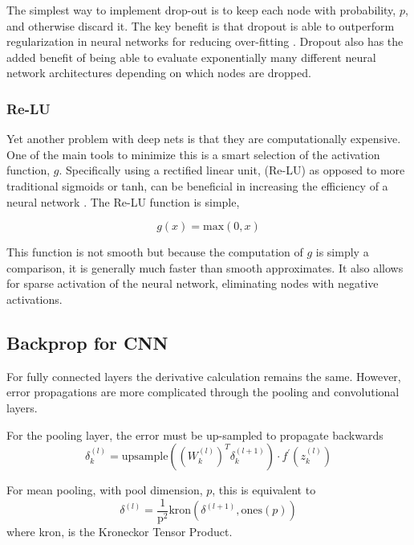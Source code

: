 \documentclass[12pt, twocolumn]{article}
\begin{document}
The simplest way to implement drop-out is to keep each node with probability, $p$, and otherwise discard it. The key benefit is that dropout is able to outperform regularization in neural networks for reducing over-fitting \cite{Dropout}. Dropout also has the added benefit of being able to evaluate exponentially many different neural network architectures depending on which nodes are dropped.
 
\subsubsection{Re-LU}

Yet another problem with deep nets is that they are computationally expensive. One of the main tools to minimize this is a smart selection of the activation function, $g$. Specifically using a rectified linear unit, (Re-LU) as opposed to more traditional sigmoids or tanh, can be beneficial in increasing the efficiency of a neural network \cite{imagenet}. The Re-LU function is simple, 

\begin{equation}
g(x)= \textrm{max}(0,x)
\end{equation}

This function is not smooth but because the computation of $g$ is simply a comparison, it is generally much faster than smooth approximates. It also allows for sparse activation of the neural network, eliminating nodes with negative activations. 

\subsection{Backprop for CNN}
For fully connected layers  the derivative calculation remains the same. However,  error propagations are more complicated through the pooling and convolutional layers. 

For the pooling layer, the error must be up-sampled to propagate backwards
\begin{equation}
\delta^{(l)}_k=\textrm{upsample}((W^{(l)}_k)^T \delta^{(l+1)}_k) \cdot f^{\prime}(z^{(l)}_k)
\end{equation}


For mean pooling, with pool dimension, $p$, this is equivalent to 
\begin{equation}
\delta^{(l)}= \frac{1}{\textrm{p}^2}  \textrm{kron}(\delta^{(l+1)}, \textrm{ones}(p))
\end{equation}
where kron, is the Kroneckor Tensor Product.
\end{document}
